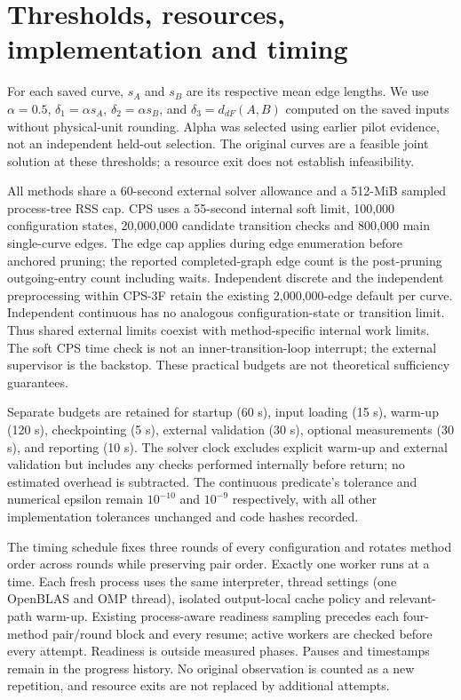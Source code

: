 \section{Thresholds, resources, implementation and timing}
For each saved curve, $s_A$ and $s_B$ are its respective mean edge lengths. We use $\alpha=0.5$, $\delta_1=\alpha s_A$, $\delta_2=\alpha s_B$, and $\delta_3=d_{dF}(A,B)$ computed on the saved inputs without physical-unit rounding. Alpha was selected using earlier pilot evidence, not an independent held-out selection. The original curves are a feasible joint solution at these thresholds; a resource exit does not establish infeasibility.

All methods share a 60-second external solver allowance and a 512-MiB sampled process-tree RSS cap. CPS uses a 55-second internal soft limit, 100,000 configuration states, 20,000,000 candidate transition checks and 800,000 main single-curve edges. The edge cap applies during edge enumeration before anchored pruning; the reported completed-graph edge count is the post-pruning outgoing-entry count including waits. Independent discrete and the independent preprocessing within CPS-3F retain the existing 2,000,000-edge default per curve. Independent continuous has no analogous configuration-state or transition limit. Thus shared external limits coexist with method-specific internal work limits. The soft CPS time check is not an inner-transition-loop interrupt; the external supervisor is the backstop. These practical budgets are not theoretical sufficiency guarantees.

Separate budgets are retained for startup (60 s), input loading (15 s), warm-up (120 s), checkpointing (5 s), external validation (30 s), optional measurements (30 s), and reporting (10 s). The solver clock excludes explicit warm-up and external validation but includes any checks performed internally before return; no estimated overhead is subtracted. The continuous predicate's tolerance and numerical epsilon remain $10^{-10}$ and $10^{-9}$ respectively, with all other implementation tolerances unchanged and code hashes recorded.

The timing schedule fixes three rounds of every configuration and rotates method order across rounds while preserving pair order. Exactly one worker runs at a time. Each fresh process uses the same interpreter, thread settings (one OpenBLAS and OMP thread), isolated output-local cache policy and relevant-path warm-up. Existing process-aware readiness sampling precedes each four-method pair/round block and every resume; active workers are checked before every attempt. Readiness is outside measured phases. Pauses and timestamps remain in the progress history. No original observation is counted as a new repetition, and resource exits are not replaced by additional attempts.

